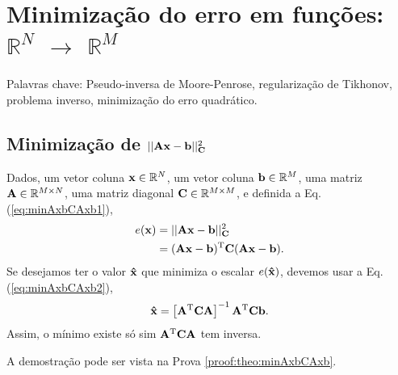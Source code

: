 
\chapter{Minimização do erro em funções: $\mathbb{R}^{N}$ $\rightarrow$ $\mathbb{R}^{M}$}

\begin{remark}
Palavras chave: 
Pseudo-inversa de Moore-Penrose,
regularização de Tikhonov,
problema inverso, 
minimização do erro quadrático. 
\end{remark}

\section{Minimização de $||\MATRIX{A}\VECTOR{x}-\VECTOR{b}||_{\MATRIX{C}}^2$
}

\begin{theorem}\label{theo:minAxbCAxb}
Dados,
um vetor coluna $\VECTOR{x}\in \mathbb{R}^N$, 
um vetor coluna $\VECTOR{b}\in \mathbb{R}^M$,  
uma matriz $\MATRIX{A} \in \mathbb{R}^{M\times N}$, 
uma matriz diagonal $\MATRIX{C} \in \mathbb{R}^{M\times M}$, e 
definida a Eq. (\ref{eq:minAxbCAxb1}),
\begin{align}\label{eq:minAxbCAxb1}
e(\VECTOR{x}) & = ||\MATRIX{A}\VECTOR{x}-\VECTOR{b}||_{\MATRIX{C}}^2 \\
              & = (\MATRIX{A}\VECTOR{x}-\VECTOR{b})^{\transpose}\MATRIX{C}(\MATRIX{A}\VECTOR{x}-\VECTOR{b}).
\end{align}
Se desejamos ter o valor $\VECTOR{\hat{x}}$ que minimiza o escalar $e(\VECTOR{\hat{x}})$,
devemos usar a Eq. (\ref{eq:minAxbCAxb2}),
\begin{equation}\label{eq:minAxbCAxb2}
\VECTOR{\hat{x}} =
\left[ \MATRIX{A}^{\transpose}\MATRIX{C} \MATRIX{A} \right]^{-1}\MATRIX{A}^{\transpose}\MATRIX{C}\VECTOR{b}.
\end{equation}
Assim, o mínimo existe só sim $\MATRIX{A}^{\transpose}\MATRIX{C} \MATRIX{A}$ tem inversa.

A demostração pode ser vista na Prova \ref{proof:theo:minAxbCAxb}.
\end{theorem}




